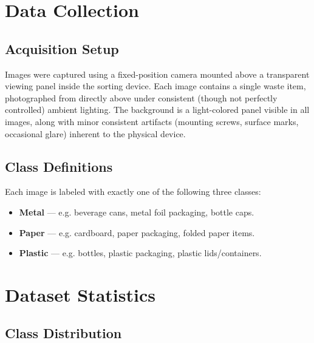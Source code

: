 \documentclass[11pt]{article}
\begin{document}
\section{Data Collection}

\subsection{Acquisition Setup}
Images were captured using a fixed-position camera mounted above a transparent viewing panel inside the sorting device. Each image contains a single waste item, photographed from directly above under consistent (though not perfectly controlled) ambient lighting. The background is a light-colored panel visible in all images, along with minor consistent artifacts (mounting screws, surface marks, occasional glare) inherent to the physical device.


\subsection{Class Definitions}
Each image is labeled with exactly one of the following three classes:
\begin{itemize}
    \item \textbf{Metal} --- e.g. beverage cans, metal foil packaging, bottle caps.
    \item \textbf{Paper} --- e.g. cardboard, paper packaging, folded paper items.
    \item \textbf{Plastic} --- e.g. bottles, plastic packaging, plastic lids/containers.
\end{itemize}

\section{Dataset Statistics}

\subsection{Class Distribution}
\end{document}
